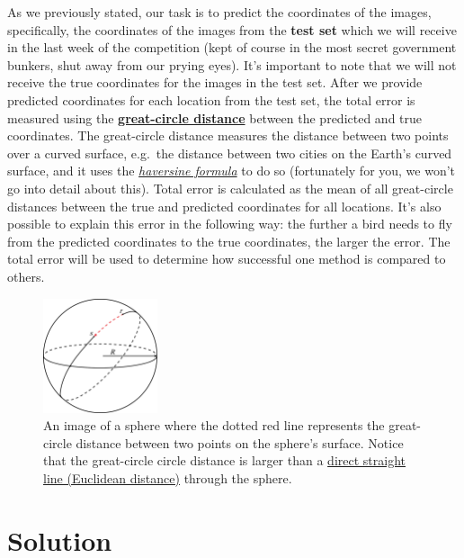 \documentclass[]{article}
\begin{document}
As we previously stated, our task is to predict the coordinates of the
images, specifically, the coordinates of the images from the
\textbf{test set} which we will receive in the last week of the
competition (kept of course in the most secret government bunkers, shut
away from our prying eyes). It's important to note that we will not
receive the true coordinates for the images in the test set. After we
provide predicted coordinates for each location from the test set, the
total error is measured using the
\href{https://en.wikipedia.org/wiki/Great-circle_distance}{\textbf{great-circle
distance}} between the predicted and true coordinates. The great-circle
distance measures the distance between two points over a curved surface,
e.g.~the distance between two cities on the Earth's curved surface, and
it uses the
\href{https://www.igismap.com/haversine-formula-calculate-geographic-distance-earth/}{\emph{haversine
formula}} to do so (fortunately for you, we won't go into detail about
this). Total error is calculated as the mean of all great-circle
distances between the true and predicted coordinates for all locations.
It's also possible to explain this error in the following way: the
further a bird needs to fly from the predicted coordinates to the true
coordinates, the larger the error. The total error will be used to
determine how successful one method is compared to others.

\begin{figure}
\centering
\includegraphics[width=0.3\textwidth,height=\textheight]{./tex2pdf.-3ffa51a14b505aec/6ebbcc989e4388d5de5c12c9eb5f292eee5c5ae5.png}
\caption{An image of a sphere where the dotted red line represents the
great-circle distance between two points on the sphere's surface. Notice
that the great-circle circle distance is larger than a
\href{https://en.wikipedia.org/wiki/Euclidean_distance}{direct straight
line (Euclidean distance)} through the sphere.}
\end{figure}

\hypertarget{solution}{%
\section{Solution}\label{solution}}
\end{document}

